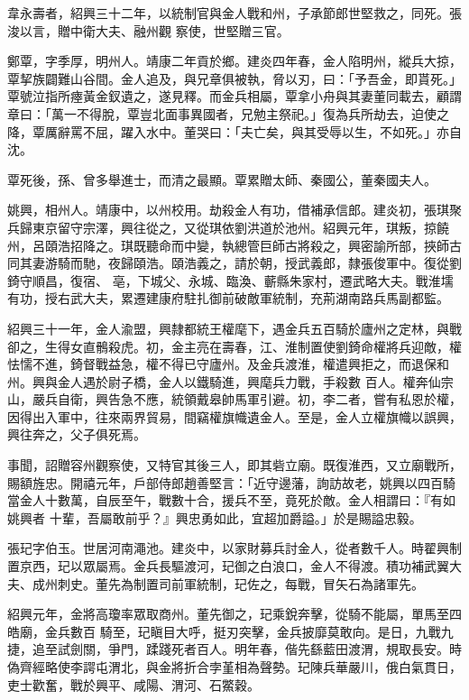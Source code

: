 \begin{pinyinscope}
 韋永壽者，紹興三十二年，以統制官與金人戰和州，子承節郎世堅救之，同死。張浚以言，贈中衛大夫、融州觀
 察使，世堅贈三官。



 鄭覃，字季厚，明州人。靖康二年貢於鄉。建炎四年春，金人陷明州，縱兵大掠，覃挈族闢難山谷間。金人追及，與兄章俱被執，脅以刃，曰：「予吾金，即貰死。」覃號泣指所瘞黃金釵遺之，遂見釋。而金兵相屬，覃拿小舟與其妻董同載去，顧謂章曰：「萬一不得脫，覃豈北面事異國者，兄勉主祭祀。」復為兵所劫去，迫使之降，覃厲辭罵不屈，躍入水中。董哭曰：「夫亡矣，與其受辱以生，不如死。」亦自沈。



 覃死後，孫、曾多舉進士，而清之最顯。覃累贈太師、秦國公，董秦國夫人。



 姚興，相州人。靖康中，以州校用。劫殺金人有功，借補承信郎。建炎初，張琪聚兵歸東京留守宗澤，興往從之，又從琪依劉洪道於池州。紹興元年，琪叛，掠饒州，呂頤浩招降之。琪既聽命而中變，執總管巨師古將殺之，興密諭所部，挾師古同其妻游騎而馳，夜歸頤浩。頤浩義之，請於朝，授武義郎，隸張俊軍中。復從劉錡守順昌，復宿、
 亳，下城父、永城、臨渙、蘄縣朱家村，遷武略大夫。戰淮壖有功，授右武大夫，累遷建康府駐扎御前破敵軍統制，充荊湖南路兵馬副都監。



 紹興三十一年，金人渝盟，興隸都統王權麾下，遇金兵五百騎於廬州之定林，與戰卻之，生得女直鶻殺虎。初，金主亮在壽春，江、淮制置使劉錡命權將兵迎敵，權怯懦不進，錡督戰益急，權不得已守廬州。及金兵渡淮，權遣興拒之，而退保和州。興與金人遇於尉子橋，金人以鐵騎進，興麾兵力戰，手殺數
 百人。權奔仙宗山，嚴兵自衛，興告急不應，統領戴皋帥馬軍引避。初，李二者，嘗有私恩於權，因得出入軍中，往來兩界貿易，間竊權旗幟遺金人。至是，金人立權旗幟以誤興，興往奔之，父子俱死焉。



 事聞，詔贈容州觀察使，又特官其後三人，即其砦立廟。既復淮西，又立廟戰所，賜額旌忠。開禧元年，戶部侍郎趙善堅言：「近守邊藩，詢訪故老，姚興以四百騎當金人十數萬，自辰至午，戰數十合，援兵不至，竟死於敵。金人相謂曰：『有如姚興者
 十輩，吾屬敢前乎？』興忠勇如此，宜超加爵謚。」於是賜謚忠毅。



 張玘字伯玉。世居河南澠池。建炎中，以家財募兵討金人，從者數千人。時翟興制置京西，玘以眾屬焉。金兵長驅渡河，玘御之白浪口，金人不得渡。積功補武翼大夫、成州刺史。董先為制置司前軍統制，玘佐之，每戰，冒矢石為諸軍先。



 紹興元年，金將高瓊率眾取商州。董先御之，玘乘銳奔擊，從騎不能屬，單馬至四皓廟，金兵數百
 騎至，玘瞋目大呼，挺刃突擊，金兵披靡莫敢向。是日，九戰九捷，追至試劍關，爭門，蹂踐死者百人。明年春，偕先繇藍田渡渭，規取長安。時偽齊經略使李諤屯渭北，與金將折合孛堇相為聲勢。玘陳兵華嚴川，俄白氣貫日，吏士歡奮，戰於興平、咸陽、渭河、石鱉穀。




\end{pinyinscope}
